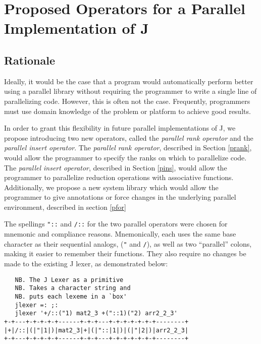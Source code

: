 \chapter{Proposed Operators for a Parallel Implementation of J} %
\label{paraop}

\section{Rationale}
Ideally, it would be the case that a program would automatically perform better using a parallel library 
without requiring the programmer to write a single line of parallelizing code. 
However, this is often not the case. 
Frequently, programmers must use domain knowledge of the problem or platform to achieve good results. 

In order to grant this flexibility in future parallel implementations of J, 
we propose introducing two new operators, called the \textit{parallel rank operator} 
and the \textit{parallel insert operator}.
The \textit{parallel rank operator}, described in Section \ref{prank}, 
would allow the programmer to specify the ranks on which to parallelize code.
The \textit{parallel insert operator}, described in Section \ref{pins}, 
would allow the programmer to parallelize reduction operations with associative functions.
Additionally, we propose a new system library
which would allow the programmer to give annotations or force changes in the underlying parallel environment,
described in section \ref{pfor}

The spellings \texttt{"::}  and \texttt{/::} for the two parallel operators were chosen for mnemonic and compliance reasons.
Mnemonically, each uses the same base character as their sequential analogs, (\texttt{"} and \texttt{/}), 
as well as two ``parallel'' colons, making it easier to remember their functions.
They also require no changes be made to the existing J lexer\cite{ioj}, 
as demonstrated below:

\begin{singlespacing}
\begin{small}
\begin{verbatim}
   NB. The J Lexer as a primitive
   NB. Takes a character string and 
   NB. puts each lexeme in a `box'
   jlexer =: ;:
   jlexer '+/::("1) mat2_3 +("::1)("2) arr2_2_3'
+-+---+-+-+-+-+------+-+-+---+-+-+-+-+-+-+--------+
|+|/::|(|"|1|)|mat2_3|+|(|"::|1|)|(|"|2|)|arr2_2_3|
+-+---+-+-+-+-+------+-+-+---+-+-+-+-+-+-+--------+
\end{verbatim}
\end{small}
\end{singlespacing}

